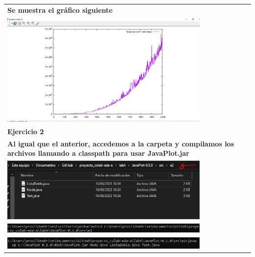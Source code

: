 \documentclass[9pt]{article}
\begin{document}
\begin{longtable}{|p{15cm}|}
		\textbf{Se muestra el gráfico siguiente}\\
		\includegraphics[width=0.8\textwidth,keepaspectratio]{img/graficoPlot1.png}\\
		
		\textbf{Ejercicio 2}\\
		\textbf{Al igual que el anterior, accedemos a la carpeta y compilamos los archivos llamando a classpath para usar JavaPlot.jar}\\
		\includegraphics[width=0.8\textwidth,keepaspectratio]{img/carpeta2.png}\\
		\includegraphics[width=0.8\textwidth,keepaspectratio]{img/redireccion.png}\\
		\includegraphics[width=0.8\textwidth,keepaspectratio]{img/compilar2.png}\\
		

\end{longtable}
\end{document}
